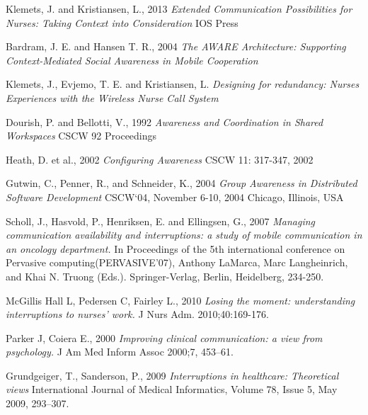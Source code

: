 \documentclass[b5paper, 11pt, norsk]{MScthesisITEM}
\begin{document}
\begin{thebibliography}{99}

Klemets, J. and Kristiansen, L., 2013
\emph{Extended Communication Possibilities for Nurses: Taking Context into Consideration}
IOS Press
  

Bardram, J. E. and Hansen T. R., 2004
\emph{The AWARE Architecture: Supporting Context-Mediated Social Awareness in Mobile Cooperation}

Klemets, J., Evjemo, T. E. and Kristiansen, L.
\emph{Designing for redundancy: Nurses Experiences with the Wireless Nurse Call System}

Dourish, P. and Bellotti, V., 1992
\emph{Awareness and Coordination in Shared Workspaces}
CSCW 92 Proceedings

Heath, D. et al., 2002
\emph{Configuring Awareness}
CSCW 11: 317-347, 2002

Gutwin, C., Penner, R., and Schneider, K., 2004
\emph{Group Awareness in Distributed Software Development}
CSCW`04, November 6-10, 2004 Chicago, Illinois, USA

Scholl, J., Hasvold, P., Henriksen, E. and Ellingsen, G., 2007
\emph {Managing communication availability and interruptions: a study of mobile communication in an oncology department.} 
In Proceedings of the 5th international conference on Pervasive computing(PERVASIVE'07), Anthony LaMarca, Marc Langheinrich, and Khai N. Truong (Eds.). Springer-Verlag, Berlin, Heidelberg, 234-250.

McGillis Hall L, Pedersen C, Fairley L., 2010
\emph {Losing the moment: understanding interruptions to nurses' work.}
J Nurs Adm. 2010;40:169-176.

Parker J, Coiera E., 2000
\emph {Improving clinical communication: a view from psychology.} 
J Am Med Inform Assoc 2000;7, 453–61.

Grundgeiger, T., Sanderson, P., 2009
\emph {Interruptions in healthcare: Theoretical views}
International Journal of Medical Informatics, Volume 78, Issue 5, May 2009, 293–307.


\end{thebibliography}
\end{document}

